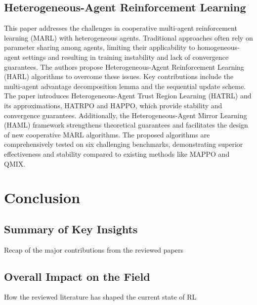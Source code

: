 \documentclass[journal]{IEEEtran}
\begin{document}
\subsection{Heterogeneous-Agent Reinforcement Learning}
This paper addresses the challenges in cooperative multi-agent reinforcement learning (MARL) with heterogeneous agents. Traditional approaches often rely on parameter sharing among agents, limiting their applicability to homogeneous-agent settings and resulting in training instability and lack of convergence guarantees. The authors propose Heterogeneous-Agent Reinforcement Learning (HARL) algorithms to overcome these issues. Key contributions include the multi-agent advantage decomposition lemma and the sequential update scheme. The paper introduces Heterogeneous-Agent Trust Region Learning (HATRL) and its approximations, HATRPO and HAPPO, which provide stability and convergence guarantees. Additionally, the Heterogeneous-Agent Mirror Learning (HAML) framework strengthens theoretical guarantees and facilitates the design of new cooperative MARL algorithms. The proposed algorithms are comprehensively tested on six challenging benchmarks, demonstrating superior effectiveness and stability compared to existing methods like MAPPO and QMIX.
\cite{zhong2024}



\section{Conclusion}
\label{sec:conclusion}

\subsection{Summary of Key Insights}
Recap of the major contributions from the reviewed papers

\subsection{Overall Impact on the Field}
How the reviewed literature has shaped the current state of RL


\label{sec:references}
\printbibliography

\end{document}
